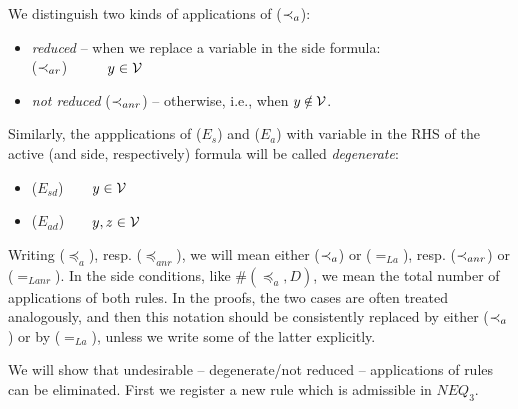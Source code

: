 \begin{DEFINITION}
\begin{itemize}
\end{itemize}
We distinguish two kinds of applications of ($\mathbin{\prec}_a$):
\begin{itemize}\MyLPar
\item  {\em reduced} -- when we replace a variable in the side formula:\\
 ($\mathbin{\prec}_{ar}$)\ \ 
\label{ru:ar}\ \ \  $y\in {\cal V}$
\item {\em not reduced} ($\mathbin{\prec}_{anr}$) -- otherwise, i.e.,  when
$y\not\in\Vars$. 
\end{itemize}
Similarly, the appplications of ($E_s$) and ($E_a$) with variable in the RHS
of the active (and side, respectively) formula will be
called {\em degenerate}:
\begin{itemize}\MyLPar
\item ($E_{sd}$)\ \ \ \
 $y\in{\cal V}$
\item ($E_{ad}$)\ \ \prule{\Gamma,x\Incl z, y\Incl x,\Seq\Delta}{\Gamma,
y\Incl z,\Seq\Delta}\ \
 $y, z\in{\cal V}$
\end{itemize}
\end{DEFINITION}
\begin{REMARK}\label{re:notation}
Writing ($\preceq_a$), resp. ($\preceq_{anr}$), we will mean 
either ($\mathbin{\prec}_a$) or ($=_{La}$), resp. ($\mathbin{\prec}_{anr}$) or ($=_{Lanr}$).
In the side conditions, like $\#(\preceq_a,D)$, we mean the total number
of applications of both rules.
In the proofs, the
 two cases are often treated analogously, and then this notation should be
 consistently replaced by either ($\mathbin{\prec}_a$) or by ($=_{La}$), unless we
 write some of the latter explicitly. 
\end{REMARK}
\noindent
We will show that undesirable -- degenerate/not reduced -- applications of rules
can be eliminated.
First we register a new rule which is admissible in $NEQ_3$.
